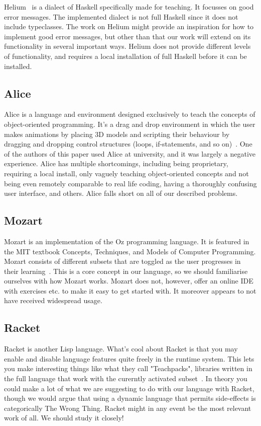 Helium~\cite{DBLP:conf/haskell/HeerenLI03} is a dialect of Haskell specifically
made for teaching. It focusses on good error messages. The implemented dialect
is not full Haskell since it does not include typeclasses. The work on Helium
might provide an inspiration for how to implement good error messages, but other
than that our work will extend on its functionality in several important ways.
Helium does not provide different levels of functionality, and requires a local
installation of full Haskell before it can be installed.

\subsection{Alice}
Alice is a language and environment designed exclusively to teach the concepts 
of object-oriented programming. It's a drag and drop environment in which the 
user makes animations by placing 3D models and scripting their behaviour by 
dragging and dropping control structures (loops, if-statements, and so 
on)~\cite{alice2015whatisalice}. One of the authors of this paper used Alice 
at university, and it was largely a negative experience. Alice has multiple 
shortcomings, including being proprietary, requiring a local install, only 
vaguely teaching object-oriented concepts and not being even remotely 
comparable to real life coding, having a thoroughly confusing user interface, 
and others. Alice falls short on all of our described problems.

\subsection{Mozart}
Mozart is an implementation of the Oz programming language. It is featured in 
the MIT textbook Concepts, Techniques, and Models of Computer Programming. 
Mozart consists of different subsets that are toggled as the user progresses 
in their learning~\cite{van2004concepts}. This is a core concept in our 
language, so we should familiarise ourselves with how Mozart works. Mozart 
does not, however, offer an online IDE with exercises etc. to make it easy to 
get started with. It moreover appears to not have received widespread usage.

\subsection{Racket}
Racket is another Lisp language. What's cool about Racket is that you may 
enable and disable language features quite freely in the runtime system. This 
lets you make interesting things like what they call "Teachpacks", libraries 
written in the full language that work with the curerntly activated 
subset~\cite{flatt2015racket}. In theory you could make a lot of what we are 
suggesting to do with our language with Racket, though we would argue that 
using a dynamic language that permits side-effects is categorically The Wrong 
Thing. Racket might in any event be the most relevant work of all. We should 
study it closely!

